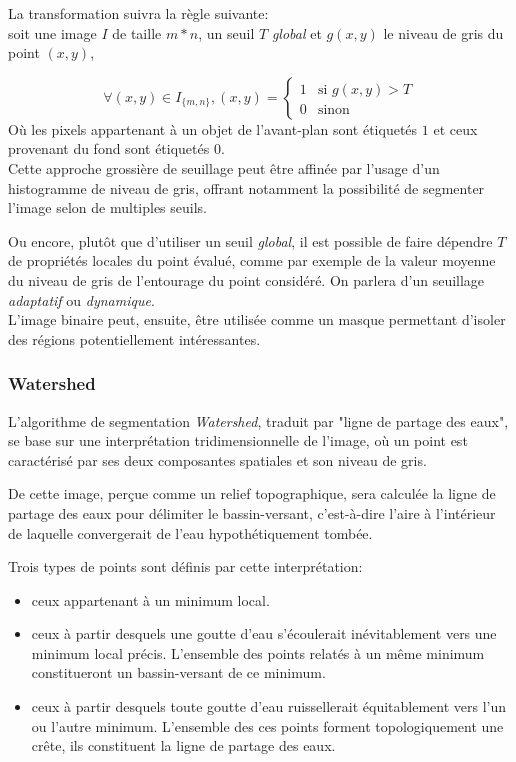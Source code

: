 \documentclass[a4paper,12pt]{report}
\begin{document}
La transformation suivra la règle suivante:\\
soit une image $I$ de taille $m*n$, un seuil $T$ \textit{global} et $g(x,y)$ le niveau de gris du point $(x,y)$,

$$ \forall (x,y) \in I_{\{m,n\}}, (x,y) = \left\{ 
\begin{array}{rl}
1 &\mbox{si } g(x,y)>T\\
0 &\mbox{sinon}
\end{array} \right.
$$ 
Où les pixels appartenant à un objet de l'avant-plan sont étiquetés $1$ et ceux provenant du fond sont étiquetés $0$.\\ 

Cette approche grossière de seuillage peut être affinée par l'usage d'un histogramme de niveau de gris, offrant notamment la possibilité de segmenter l'image selon de multiples seuils.

Ou encore, plutôt que d'utiliser un seuil \textit{global}, il est possible de faire dépendre $T$ de propriétés locales du point évalué, comme par exemple de la valeur moyenne du niveau de gris de l'entourage du point considéré. On parlera d'un seuillage \textit{adaptatif} ou \textit{dynamique}.\\

L'image binaire peut, ensuite, être utilisée comme un masque permettant d'isoler des régions potentiellement intéressantes.

\subsubsection{Watershed}
L'algorithme de segmentation \textit{Watershed}, traduit par "ligne de partage des eaux", se base sur une interprétation tridimensionnelle de l'image, où un point est caractérisé par ses deux composantes spatiales et son niveau de gris.

De cette image, perçue comme un relief topographique, sera calculée la ligne de partage des eaux pour délimiter le bassin-versant, c'est-à-dire l'aire à l'intérieur de laquelle convergerait de l'eau hypothétiquement tombée. 

Trois types de points sont définis par cette interprétation:
\begin{itemize}
\item ceux appartenant à un minimum local.
\item ceux à partir desquels une goutte d'eau s'écoulerait inévitablement vers une minimum local précis. L'ensemble des points relatés à un même minimum constitueront un bassin-versant de ce minimum.
\item ceux à partir desquels toute goutte d'eau ruissellerait équitablement vers l'un ou l'autre minimum. L'ensemble des ces points forment topologiquement une crête, ils constituent la ligne de partage des eaux.\\
\end{itemize} 
 
\end{document}
